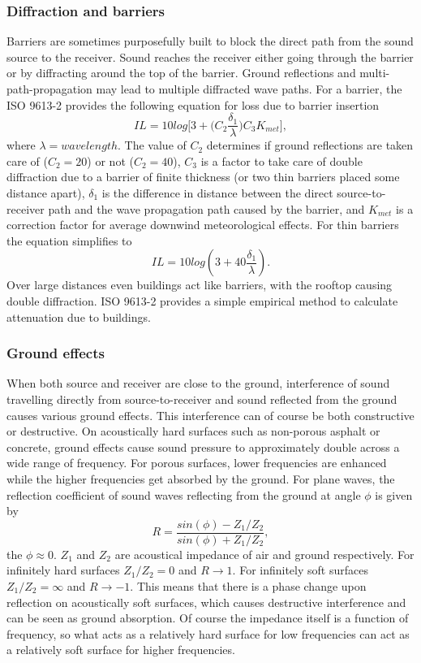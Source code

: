 \subsubsection{Diffraction and barriers}
Barriers are sometimes purposefully built to block the direct path from the sound source to the receiver. Sound reaches the receiver either going through the barrier or by diffracting around the top of the barrier. Ground reflections and multi-path-propagation may lead to multiple diffracted wave paths. For a barrier, the ISO 9613-2 \cite{ISO9613} provides the following equation for loss due to barrier insertion
\begin{equation}
    IL = 10log\bigg[3+\bigg(C_2\frac{\delta_1}{\lambda}\bigg)C_3K_{met}\bigg],
\end{equation}
where $\lambda=wavelength$. The value of $C_2$ determines if ground reflections are taken care of ($C_2 = 20$) or not ($C_2 = 40$), $C_3$ is a factor to take care of double diffraction due to a barrier of finite thickness (or two thin barriers placed some distance apart), $\delta_1$ is the difference in distance between the direct source-to-receiver path and the wave propagation path caused by the barrier, and $K_{met}$ is a correction factor for average downwind meteorological effects. For thin barriers the equation simplifies to 
\begin{equation}
    IL = 10log(3+40\frac{\delta_1}{\lambda}). 
\end{equation}
Over large distances even buildings act like barriers, with the rooftop causing double diffraction. ISO 9613-2 \cite{ISO9613} provides a simple empirical method to calculate attenuation due to buildings.
\subsubsection{Ground effects}
When both source and receiver are close to the ground, interference of sound travelling directly from  source-to-receiver and sound reflected from the ground causes various ground effects. This interference can of course be both constructive or destructive. On acoustically hard surfaces such as non-porous asphalt or concrete, ground effects cause sound pressure to approximately double across a wide range of frequency. For porous surfaces, lower frequencies are enhanced while the higher frequencies get absorbed by the ground. For plane waves, the reflection coefficient of sound waves reflecting from the ground at angle $\phi$ is given by
\begin{equation}
R = \frac{sin (\phi) - Z_1/Z_2}{sin (\phi) + Z_1/Z_2},
\end{equation}
the $\phi \approx 0$. $Z_1$ and $Z_2$ are acoustical impedance of air and ground respectively. For infinitely hard surfaces $Z_1/Z_2 = 0$ and $R \to 1$. For infinitely soft surfaces  $Z_1/Z_2 = \infty$ and $R \to -1$. This means that there is a phase change upon reflection on acoustically soft surfaces, which causes destructive interference and can be seen as ground absorption. Of course the impedance itself is a function of frequency, so what acts as a relatively hard surface for low frequencies can act as a relatively soft surface for higher frequencies. 

